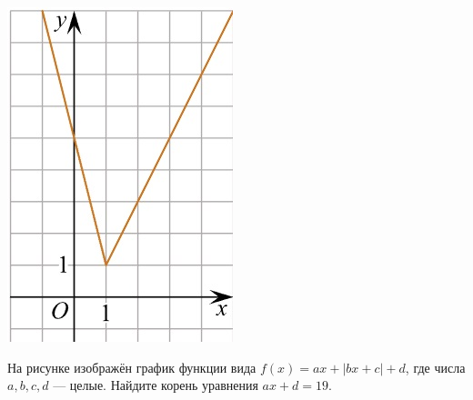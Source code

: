 \begin{class}[number=5]
\begin{listofex}
\begin{minipage}[c]{0.15\textwidth}
			\includegraphics[align=t, width=\textwidth]{pics/G101M4C5-6.jpg}
		\end{minipage}
		\item
		\begin{minipage}[t]{0.76\textwidth}
			На рисунке изображён график функции вида \(f(x)=ax+|bx+c|+d\), где числа \(a, b, c, d\) --- целые. Найдите корень уравнения \(ax+d=19\).
		\end{minipage}
		\begin{minipage}[c]{0.15\textwidth}

\end{minipage}
\end{listofex}
\end{class}
